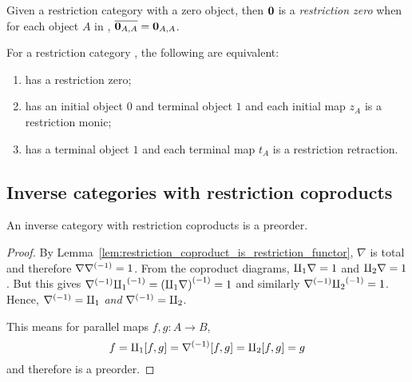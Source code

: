 \begin{definition}\label{def:restriction_zero}
  Given a restriction category \X with a zero object, then $\mathbf{0}$ is a \emph{restriction zero} when
  for each object $A$ in \X, $\overline{\mathbf{0}_{A,A}} = \mathbf{0}_{A,A}$.
\end{definition}

\begin{lemma}\label{lem:restriction_zero_equivalences}
  For a restriction category \X, the following are equivalent:
  \begin{enumerate}[{(}i{)}]
    \item \X has a restriction zero;
    \item \X has an initial object $0$ and terminal object $1$ and each initial map $z_A$ is a
      restriction monic;
    \item \X has a terminal object $1$ and each terminal map $t_A$ is a restriction retraction.
  \end{enumerate}
\end{lemma}




\subsection{Inverse categories with restriction coproducts} %
\label{sub:inverse_categories_with_restriction_coproducts}


\begin{proposition}\label{prop:inverse_category_with_coproducts_is_pre-order}
  An inverse category \X with restriction coproducts is a preorder.
\end{proposition}
\begin{proof}
  By Lemma~\ref{lem:restriction_coproduct_is_restriction_functor}, $\nabla$ is total and
  therefore $\nabla{\nabla}^{(-1)} = 1$. From the coproduct diagrams, $\amalg_{1}\nabla =1$ and
  $\amalg_{2}\nabla = 1$. But this gives ${\nabla}^{(-1)}{\amalg_{1}}^{(-1)} = {(\amalg_{1}\nabla)}^{(-1)} = 1$ and
  similarly ${\nabla}^{(-1)}{\amalg_{2}}^{(-1)} =1$. Hence, ${\nabla}^{(-1)} = \amalg_{1}$ \emph{and} ${\nabla}^{(-1)} =
  \amalg_{2}$.

  This means for parallel maps $f,g:A \to B$,
  \[
    f = \amalg_{1} [f,g] = {\nabla}^{(-1)} [f,g] = \amalg_{2} [f,g] = g
  \]
  and therefore \X is a preorder.
\end{proof}

